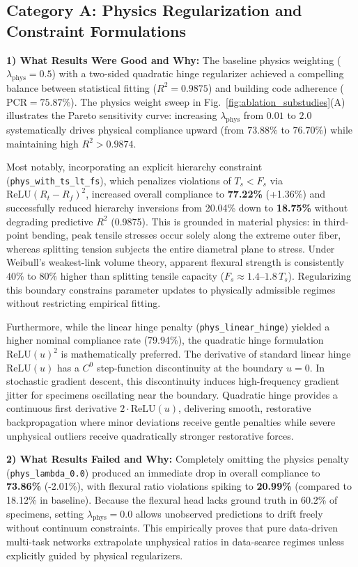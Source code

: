 \documentclass[conference]{IEEEtran}
\begin{document}
\subsection{Category A: Physics Regularization and Constraint Formulations}
\textbf{1) What Results Were Good and Why:}
The baseline physics weighting ($\lambda_{\text{phys}} = 0.5$) with a two-sided quadratic hinge regularizer achieved a compelling balance between statistical fitting ($R^2 = 0.9875$) and building code adherence ($\text{PCR} = 75.87\%$). The physics weight sweep in Fig.~\ref{fig:ablation_substudies}(A) illustrates the Pareto sensitivity curve: increasing $\lambda_{\text{phys}}$ from $0.01$ to $2.0$ systematically drives physical compliance upward (from $73.88\%$ to $76.70\%$) while maintaining high $R^2 > 0.9874$. 

Most notably, incorporating an explicit hierarchy constraint (\texttt{phys\_with\_ts\_lt\_fs}), which penalizes violations of $T_s < F_s$ via $\text{ReLU}(R_t - R_f)^2$, increased overall compliance to \textbf{77.22\%} (+1.36\%) and successfully reduced hierarchy inversions from 20.04\% down to \textbf{18.75\%} without degrading predictive $R^2$ (0.9875). This is grounded in material physics: in third-point bending, peak tensile stresses occur solely along the extreme outer fiber, whereas splitting tension subjects the entire diametral plane to stress. Under Weibull's weakest-link volume theory, apparent flexural strength is consistently $40\%$ to $80\%$ higher than splitting tensile capacity ($F_s \approx 1.4\text{--}1.8\,T_s$). Regularizing this boundary constrains parameter updates to physically admissible regimes without restricting empirical fitting.

Furthermore, while the linear hinge penalty (\texttt{phys\_linear\_hinge}) yielded a higher nominal compliance rate (79.94\%), the quadratic hinge formulation $\text{ReLU}(u)^2$ is mathematically preferred. The derivative of standard linear hinge $\text{ReLU}(u)$ has a $C^0$ step-function discontinuity at the boundary $u=0$. In stochastic gradient descent, this discontinuity induces high-frequency gradient jitter for specimens oscillating near the boundary. Quadratic hinge provides a continuous first derivative $2\cdot\text{ReLU}(u)$, delivering smooth, restorative backpropagation where minor deviations receive gentle penalties while severe unphysical outliers receive quadratically stronger restorative forces.

\textbf{2) What Results Failed and Why:}
Completely omitting the physics penalty (\texttt{phys\_lambda\_0.0}) produced an immediate drop in overall compliance to \textbf{73.86\%} (-2.01\%), with flexural ratio violations spiking to \textbf{20.99\%} (compared to 18.12\% in baseline). Because the flexural head lacks ground truth in 60.2\% of specimens, setting $\lambda_{\text{phys}} = 0.0$ allows unobserved predictions to drift freely without continuum constraints. This empirically proves that pure data-driven multi-task networks extrapolate unphysical ratios in data-scarce regimes unless explicitly guided by physical regularizers.
\end{document}

